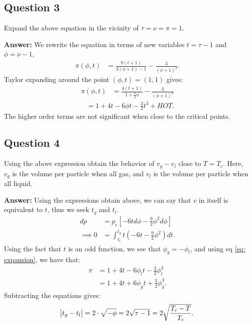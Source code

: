 \documentclass[a4paper]{article}
\newcommand{\newparagraph}{\vspace{.5cm}\noindent}
\begin{document}
\subsection*{Question 3}
Expand the above equation in the vicinity of $\tau = \nu = \pi = 1$.

\newparagraph
\textbf{Answer: }We rewrite the equation in terms of new variables $t = \tau - 1$ and $\phi = \nu - 1$,
\begin{align*}
    \pi(\phi, t) &= \frac{8(t + 1)}{3(\phi + 1) - 1} - \frac{3}{(\phi + 1)^2}.
\end{align*}Taylor expanding around the point $(\phi, t) = (1,1)$ gives:
\begin{align*}
    \pi(\phi, t) &= \frac{4(t + 1)}{1 + \frac{3}{2}\phi} - \frac{3}{(\phi + 1)^2}
\end{align*}
\begin{align}
    &= 1 + 4t - 6\phi t -\frac{3}{2}t^3 + HOT.\label{eq: expansion}
\end{align}The higher order terms are not significant when close to the critical points.




\subsection*{Question 4}
Using the above expression obtain the behavior of $v_g - v_l$ close to $T = T_c$. Here, $v_g$ is the volume per particle when all gas, and $v_l$ is the volume per particle when all liquid.

\newparagraph
\textbf{Answer: }Using the expressions obtain above, we can say that $v$ in itself is equivalent to $t$, thus we seek $t_g$ and $t_l$.
\begin{align*}
    dp &= p_c\left[-6t d\phi - \frac{9}{2}\phi^2d\phi\right]\\
    \implies 0 &= \int_{t_l}^{t_g} t\left(-6t - \frac{9}{2}\phi^2\right)dt.
\end{align*}Using the fact that $t$ is an odd function, we see that $\phi_g = -\phi_l$, and using eq \eqref{eq: expansion}, we have that:
\begin{align*}
    \pi &= 1 + 4t - 6\phi_l t -\frac{3}{2}\phi_l^3\\
    &= 1 + 4t + 6\phi_g t +\frac{3}{2}\phi_g^3.
\end{align*}Subtracting the equations gives:
\begin{align*}
    \abs{t_g - t_l} = 2\cdot \sqrt{-\phi} = 2\sqrt{\tau - 1} = 2\sqrt{\frac{T_c-T}{T_c}}. 
\end{align*}
\end{document}
